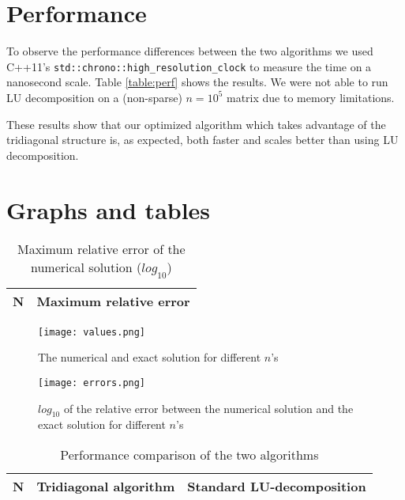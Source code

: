 \documentclass[a4paper]{article}
\begin{document}
\section{Performance}

To observe the performance differences between the two algorithms we
used C++11's \texttt{std::chrono::high\_resolution\_clock} to measure
the time on a nanosecond scale. Table \vref{table:perf} shows the
results. We were not able to run LU decomposition on a (non-sparse) $n =
10^5$ matrix due to memory limitations.

These results show that our optimized algorithm which takes advantage of
the tridiagonal structure is, as expected, both faster and scales better
than using LU decomposition.

\section{Graphs and tables}

\begin{table}[H]
  \centering
  \begin{tabular}{r | l}
    N & Maximum relative error \\
    \hline
    
  \end{tabular}
  \caption{Maximum relative error of the numerical solution ($log_{10}$)}
  \label{table:max-errors}
\end{table}

\begin{figure}[H]
  \texttt{[image: values.png]}
  \caption{The numerical and exact solution for different $n$'s}
  \label{fig:values}
\end{figure}

\begin{figure}[H]
  \texttt{[image: errors.png]}
  \caption{$log_{10}$ of the relative error between the numerical solution
  and the exact solution for different $n$'s}
  \label{fig:errors}
\end{figure}

\begin{table}[H]
  \centering
  \begin{tabular}{r | l | l}
    N & Tridiagonal algorithm & Standard LU-decomposition \\ \hline
    
  \end{tabular}
  \caption{Performance comparison of the two algorithms}
  \label{table:perf}
\end{table}
\end{document}
